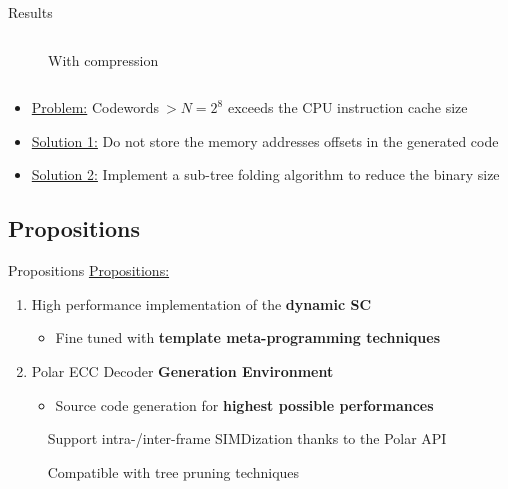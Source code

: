 \begin{frame}{Results}
\begin{columns}
\begin{column}[T]{6.0cm}
{\begin{figure}[!h]
{
    }
    \caption*{With compression}
    \end{figure}
    }
  \end{column}
  \end{columns}
  \vfill
  \begin{itemize}
    \item \underline{Problem:} Codewords$~> N = 2^8$ exceeds the CPU instruction cache size
    \vspace{0.2cm}
    \item<2-> \underline{Solution 1:} Do not store the memory addresses offsets in the generated code
    \vspace{0.2cm}
    \item<3-> \underline{Solution 2:} Implement a sub-tree folding algorithm to reduce the binary size
  \end{itemize}
\end{frame}

\subsection[Propositions]{Propositions}

\begin{frame}{Propositions}
  \vfill
  \underline{Propositions:}

  \vspace{0.3cm}
  \begin{enumerate}
    \item High performance implementation of the \textbf{dynamic SC}
    \begin{itemize}
      \item Fine tuned with \textbf{template meta-programming techniques}
    \end{itemize}
    \pause
    \vspace{0.3cm}
    \item Polar ECC Decoder \textbf{Generation Environment}
    \begin{itemize}
      \item Source code generation for \textbf{highest possible performances}
    \end{itemize}
  \end{enumerate}
  \vfill
  \pause

  \vspace*{.5em}
  ~~~~~{\color{bleuUni}\Large\MVRightarrow} Support intra-/inter-frame SIMDization thanks to the Polar API

  \vspace*{.5em}
  ~~~~~{\color{bleuUni}\Large\MVRightarrow} Compatible with tree pruning techniques

  \vfill
\end{frame}

